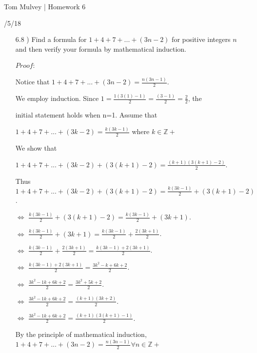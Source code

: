 \documentclass[12pt]{article}
\newcommand{\Z}{\mathbb Z}
\newcommand{\ind}{\hspace{10mm}}
\begin{document}
    \centerline{\sc \large Tom Mulvey | Homework 6 }
    \centerline{/5/18}

    \vspace{2pc}

	\begin{enumerate}
		\item[6.8]) Find a formula for $ 1 + 4 + 7 + ... + (3n - 2) $ for positive integers $n$ and then verify
		your formula by mathematical induction.
		
		$Proof : $
		
		\ind Notice that $ 1 + 4 + 7 + ... + (3n - 2) = \frac{n(3n - 1)}{2}$.
		
		\ind We employ induction. Since $1 = \frac{1(3(1) - 1)}{2} = \frac{(3-1)}{2} = \frac{2}{2} $, the
		
		\ind initial statement holds when n=1. Assume that 
		
		\ind \ind $ 1 + 4 + 7 + ... + (3k - 2) = \frac{k(3k - 1)}{2}$ where $k \in \Z +$
		
		\ind We show that
		
		\ind \ind $ 1 + 4 + 7 + ... + (3k - 2) + (3(k+1)-2) = \frac{(k+1)(3(k+1)-2)}{2}$.
		
		\ind Thus $ 1 + 4 + 7 + ... + (3k - 2) + (3(k+1)-2) = \frac{k(3k - 1)}{2} + (3(k+1)-2) $.
		
		\ind $\iff$ $ \frac{k(3k - 1)}{2} + (3(k+1)-2) = \frac{k(3k - 1)}{2} + (3k + 1) $.
		
		\ind $\iff$ $ \frac{k(3k - 1)}{2} + (3k + 1) = \frac{k(3k - 1)}{2} + \frac{2(3k + 1)}{2}  $.		
		
		\ind $\iff$ $ \frac{k(3k - 1)}{2} + \frac{2(3k + 1)}{2} = \frac{k(3k-1) + 2(3k+1)}{2}  $.
		
		\ind $\iff$ $ \frac{k(3k-1) + 2(3k+1)}{2} = \frac{3k^2 - k + 6k + 2}{2} $.
		
		\ind $\iff$ $ \frac{3k^2 - 1k + 6k + 2}{2} = \frac{3k^2 + 5k + 2}{2}  $.
		
		\ind $\iff$ $ \frac{3k^2 - 1k + 6k + 2}{2} = \frac{(k+1)(3k+2)}{2}  $.
		
		\ind $\iff$ $ \frac{3k^2 - 1k + 6k + 2}{2} = \frac{(k+1)(3(k+1)-1)}{2}  $.
		
		\ind \ind By the principle of mathematical induction, $ 1 + 4 + 7 + ... + (3n - 2) = \frac{n(3n - 1)}{2}
		\forall n \in \Z + $				

		\ind \ind \ind \ind \ind \ind 
		{%
			\setlength{\fboxsep}{1pt}%
			\setlength{\fboxrule}{2pt}%
		}%
		

\end{enumerate}
\end{document}
